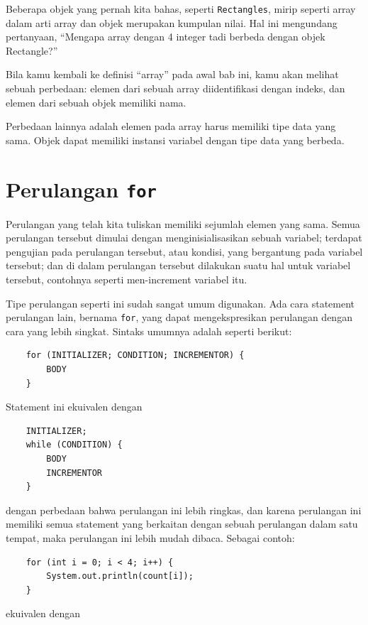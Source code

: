 Beberapa objek yang pernah kita bahas, seperti {\tt Rectangles}, mirip seperti array dalam arti array dan objek merupakan kumpulan nilai.  Hal ini mengundang pertanyaan, ``Mengapa array dengan 4 integer tadi berbeda dengan objek Rectangle?''

Bila kamu kembali ke definisi ``array'' pada awal bab ini, kamu akan melihat sebuah perbedaan: elemen dari sebuah array diidentifikasi dengan indeks, dan elemen dari sebuah objek memiliki nama.

Perbedaan lainnya adalah elemen pada array harus memiliki tipe data yang sama. Objek dapat memiliki instansi variabel dengan tipe data yang berbeda.


\section{Perulangan {\tt for}}
\label{for}

Perulangan yang telah kita tuliskan memiliki sejumlah elemen yang sama. Semua perulangan tersebut dimulai dengan menginisialisasikan sebuah variabel; terdapat pengujian pada perulangan tersebut, atau kondisi, yang bergantung pada variabel tersebut; dan di dalam perulangan tersebut dilakukan suatu hal untuk variabel tersebut, contohnya seperti men-increment variabel itu.


Tipe perulangan seperti ini sudah sangat umum digunakan. Ada cara statement perulangan lain, bernama {\tt for}, yang dapat mengekspresikan perulangan
dengan cara yang lebih singkat. Sintaks umumnya adalah seperti berikut:

\begin{lstlisting}
    for (INITIALIZER; CONDITION; INCREMENTOR) {
        BODY
    }
\end{lstlisting}
%
Statement ini ekuivalen dengan

\begin{lstlisting}
    INITIALIZER;
    while (CONDITION) {
        BODY
        INCREMENTOR
    }
\end{lstlisting}
%
dengan perbedaan bahwa perulangan ini lebih ringkas, dan karena perulangan ini memiliki semua statement yang berkaitan dengan sebuah perulangan dalam satu tempat, maka perulangan ini lebih mudah dibaca. Sebagai contoh:

\begin{lstlisting}
    for (int i = 0; i < 4; i++) {
        System.out.println(count[i]);
    }
\end{lstlisting}
%
ekuivalen dengan

